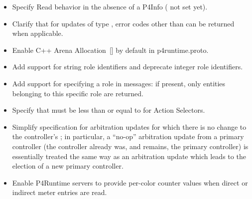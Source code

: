\documentclass[11pt]{article}
\begin{document}
{\begin{itemize}[noitemsep,topsep=\mdcompacttopsep]
\item{}Specify Read behavior in the absence of a P4Info (
not set yet).%

\item{}Clarify that for updates of type , error codes other than
 can be returned when applicable.%

\item{}Enable C++ Arena Allocation~[] by default in p4runtime.proto.%

\item{}Add support for string role identifiers and deprecate integer role
identifiers.%

\item{}Add support for specifying a role in  messages: if present, only
entities belonging to this specific role are returned.%

\item{}Specify that  must be less than or equal to  for Action
Selectors.%

\item{}Simplify specification for arbitration updates for which there is no change to
the controller's ; in particular, a \textquotedblleft{}no-op\textquotedblright{} arbitration update
from a primary controller (the controller already was, and remains, the
primary controller) is essentially treated the same way as an arbitration
update which leads to the election of a new primary controller.%

\item{}Enable P4Runtime servers to provide per-color counter values when direct or
indirect meter entries are read.%


\end{itemize}}
\end{document}
